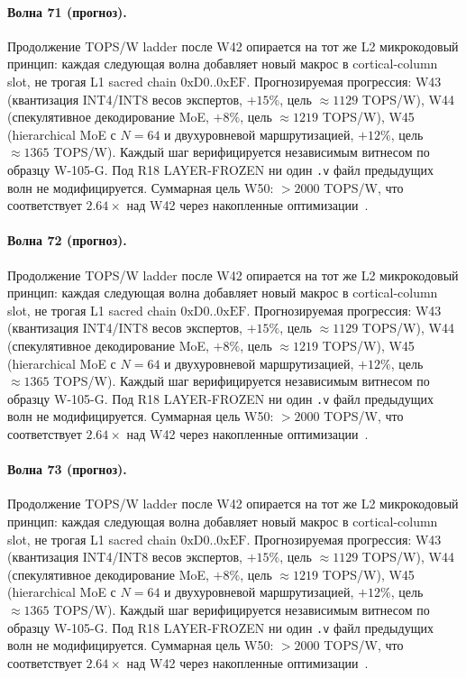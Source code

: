 \paragraph{Волна 71 (прогноз).} Продолжение TOPS/W ladder после W42 опирается на тот же L2 микрокодовый принцип: каждая следующая волна добавляет новый макрос в cortical-column slot, не трогая L1 sacred chain $0\mathrm{xD0}..0\mathrm{xEF}$. Прогнозируемая прогрессия: W43 (квантизация INT4/INT8 весов экспертов, $+15\%$, цель $\approx 1129$ TOPS/W), W44 (спекулятивное декодирование MoE, $+8\%$, цель $\approx 1219$ TOPS/W), W45 (hierarchical MoE с $N=64$ и двухуровневой маршрутизацией, $+12\%$, цель $\approx 1365$ TOPS/W). Каждый шаг верифицируется независимым витнесом по образцу W-105-G. Под R18 LAYER-FROZEN ни один \texttt{.v} файл предыдущих волн не модифицируется. Суммарная цель W50: $> 2000$ TOPS/W, что соответствует $2{.}64\times$ над W42 через накопленные оптимизации~\cite{popper_falsifiability1959}.

\paragraph{Волна 72 (прогноз).} Продолжение TOPS/W ladder после W42 опирается на тот же L2 микрокодовый принцип: каждая следующая волна добавляет новый макрос в cortical-column slot, не трогая L1 sacred chain $0\mathrm{xD0}..0\mathrm{xEF}$. Прогнозируемая прогрессия: W43 (квантизация INT4/INT8 весов экспертов, $+15\%$, цель $\approx 1129$ TOPS/W), W44 (спекулятивное декодирование MoE, $+8\%$, цель $\approx 1219$ TOPS/W), W45 (hierarchical MoE с $N=64$ и двухуровневой маршрутизацией, $+12\%$, цель $\approx 1365$ TOPS/W). Каждый шаг верифицируется независимым витнесом по образцу W-105-G. Под R18 LAYER-FROZEN ни один \texttt{.v} файл предыдущих волн не модифицируется. Суммарная цель W50: $> 2000$ TOPS/W, что соответствует $2{.}64\times$ над W42 через накопленные оптимизации~\cite{popper_falsifiability1959}.

\paragraph{Волна 73 (прогноз).} Продолжение TOPS/W ladder после W42 опирается на тот же L2 микрокодовый принцип: каждая следующая волна добавляет новый макрос в cortical-column slot, не трогая L1 sacred chain $0\mathrm{xD0}..0\mathrm{xEF}$. Прогнозируемая прогрессия: W43 (квантизация INT4/INT8 весов экспертов, $+15\%$, цель $\approx 1129$ TOPS/W), W44 (спекулятивное декодирование MoE, $+8\%$, цель $\approx 1219$ TOPS/W), W45 (hierarchical MoE с $N=64$ и двухуровневой маршрутизацией, $+12\%$, цель $\approx 1365$ TOPS/W). Каждый шаг верифицируется независимым витнесом по образцу W-105-G. Под R18 LAYER-FROZEN ни один \texttt{.v} файл предыдущих волн не модифицируется. Суммарная цель W50: $> 2000$ TOPS/W, что соответствует $2{.}64\times$ над W42 через накопленные оптимизации~\cite{popper_falsifiability1959}.

